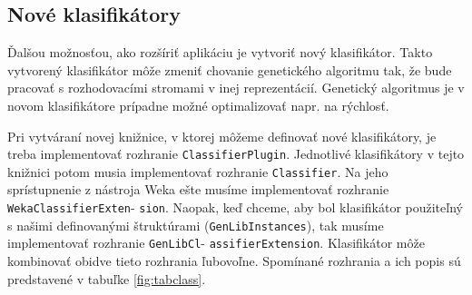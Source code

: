 \subsection{Nové klasifikátory}
Ďalšou možnosťou, ako rozšíriť aplikáciu je vytvoriť nový klasifikátor. Takto vytvorený klasifikátor môže zmeniť chovanie genetického algoritmu tak, že bude pracovať s rozhodovacími stromami v inej reprezentácií. Genetický algoritmus je v novom klasifikátore prípadne možné optimalizovať napr. na rýchlosť.

Pri vytváraní novej knižnice, v ktorej môžeme definovať nové klasifikátory, je treba implementovať rozhranie \verb|ClassifierPlugin|. Jednotlivé klasifikátory v tejto knižnici potom musia implementovať rozhranie \verb|Classifier|. Na jeho sprístupnenie z nástroja Weka ešte musíme implementovať rozhranie \verb|WekaClassifierExten|- \verb|sion|. Naopak, keď chceme, aby bol klasifikátor použiteľný s našimi definovanými štruktúrami (\verb|GenLibInstances|), tak musíme implementovať rozhranie \verb|GenLibCl|- \verb|assifierExtension|. Klasifikátor môže kombinovať obidve tieto rozhrania ľubovoľne. Spomínané rozhrania a ich popis sú predstavené v tabuľke \ref{fig:tabclass}.

